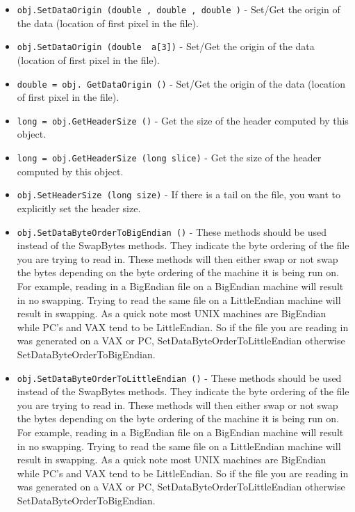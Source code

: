 \begin{itemize}
\item  \verb|obj.SetDataOrigin (double , double , double )| -  Set/Get the origin of the data (location of first pixel in the file).

\item  \verb|obj.SetDataOrigin (double  a[3])| -  Set/Get the origin of the data (location of first pixel in the file).

\item  \verb|double = obj. GetDataOrigin ()| -  Set/Get the origin of the data (location of first pixel in the file).

\item  \verb|long = obj.GetHeaderSize ()| -  Get the size of the header computed by this object.

\item  \verb|long = obj.GetHeaderSize (long slice)| -  Get the size of the header computed by this object.

\item  \verb|obj.SetHeaderSize (long size)| -  If there is a tail on the file, you want to explicitly set the
 header size.

\item  \verb|obj.SetDataByteOrderToBigEndian ()| -  These methods should be used instead of the SwapBytes methods.
 They indicate the byte ordering of the file you are trying
 to read in. These methods will then either swap or not swap
 the bytes depending on the byte ordering of the machine it is
 being run on. For example, reading in a BigEndian file on a
 BigEndian machine will result in no swapping. Trying to read
 the same file on a LittleEndian machine will result in swapping.
 As a quick note most UNIX machines are BigEndian while PC's
 and VAX tend to be LittleEndian. So if the file you are reading
 in was generated on a VAX or PC, SetDataByteOrderToLittleEndian 
 otherwise SetDataByteOrderToBigEndian. 

\item  \verb|obj.SetDataByteOrderToLittleEndian ()| -  These methods should be used instead of the SwapBytes methods.
 They indicate the byte ordering of the file you are trying
 to read in. These methods will then either swap or not swap
 the bytes depending on the byte ordering of the machine it is
 being run on. For example, reading in a BigEndian file on a
 BigEndian machine will result in no swapping. Trying to read
 the same file on a LittleEndian machine will result in swapping.
 As a quick note most UNIX machines are BigEndian while PC's
 and VAX tend to be LittleEndian. So if the file you are reading
 in was generated on a VAX or PC, SetDataByteOrderToLittleEndian 
 otherwise SetDataByteOrderToBigEndian. 


\end{itemize}
